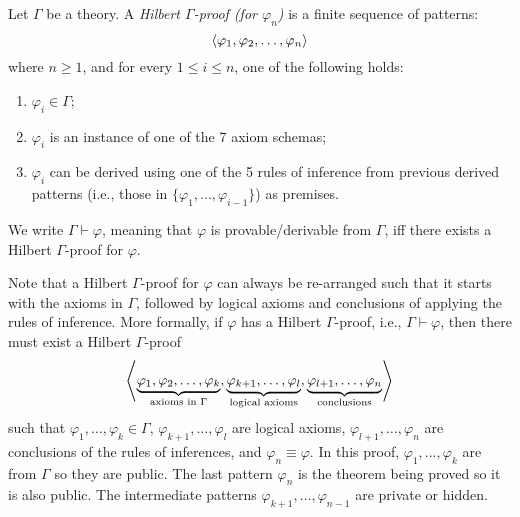 \documentclass{article}
\begin{document}
\begin{definition}
\label{def:Hilbert-proof}
Let $\Gamma$ be a theory.
A \emph{Hilbert $\Gamma$-proof (for $\varphi_n$)} is a finite sequence of patterns:
\begin{equation}
\left\langle \varphi_1 , \varphi_2 , \dots , \varphi_n \right\rangle
\end{equation}
where $n \ge 1$, and for every $1 \le i \le n$, one of the following holds:
\begin{enumerate}
\item $\varphi_i \in \Gamma$;
\item $\varphi_i$ is an instance of one of the 7 axiom schemas;
\item $\varphi_i$ can be derived using one of the 5 rules of inference
      from previous derived patterns 
      (i.e., those in $\{\varphi_1,\dots,\varphi_{i-1}\}$) as premises.  
\end{enumerate}
We write $\Gamma \vdash \varphi$, meaning that $\varphi$ is provable/derivable from $\Gamma$, 
iff there exists a Hilbert $\Gamma$-proof for $\varphi$. 
\end{definition}

Note that a Hilbert $\Gamma$-proof for $\varphi$ can always be re-arranged
such that it starts with the axioms in $\Gamma$, followed by logical axioms
and conclusions of applying the rules of inference. 
More formally, if $\varphi$ has a Hilbert $\Gamma$-proof, i.e., $\Gamma \vdash \varphi$, then there must exist
a Hilbert $\Gamma$-proof
\begin{equation}
\left\langle \underbrace{\varphi_1 , \varphi_2 , \dots, \varphi_k}_\text{axioms in $\Gamma$},
\underbrace{\varphi_{k+1},\dots,\varphi_{l}}_\text{logical axioms},
\underbrace{\varphi_{l+1}, \dots , \varphi_n}_\text{conclusions} \right\rangle
\end{equation}
such that $\varphi_1,\dots,\varphi_k \in \Gamma$,
$\varphi_{k+1},\dots,\varphi_l$ are logical axioms,
$\varphi_{l+1},\dots,\varphi_n$ are conclusions of the rules of inferences,
and $\varphi_n \equiv \varphi$. 
In this proof, $\varphi_1,\dots,\varphi_k$ are from $\Gamma$ so they are public.
The last pattern $\varphi_n$ is the theorem being proved so it is also public. 
The intermediate patterns $\varphi_{k+1},\dots,\varphi_{n-1}$ 
are private or hidden. 
\end{document}
